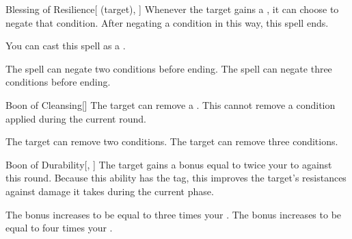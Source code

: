 \lowercase{\hypertarget{spell:Blessing of Resilience}{}}\label{spell:Blessing of Resilience}
\begin{attuneability}[Rank 3]{\hypertarget{spell:Blessing of Resilience}{Blessing of Resilience}}[ (target), ]
Whenever the target gains a , it can choose to negate that condition.
After negating a condition in this way, this spell ends.

You can cast this spell as a .

\rankline
{} The spell can negate two conditions before ending.
 The spell can negate three conditions before ending.
\end{attuneability}
\vspace{0.25em}



\lowercase{\hypertarget{spell:Boon of Cleansing}{}}\label{spell:Boon of Cleansing}
\begin{freeability}[Rank 3]{\hypertarget{spell:Boon of Cleansing}{Boon of Cleansing}}[]
The target can remove a .
This cannot remove a condition applied during the current round.

\rankline
{} The target can remove two conditions.
 The target can remove three conditions.
\end{freeability}
\vspace{0.25em}



\lowercase{\hypertarget{spell:Boon of Durability}{}}\label{spell:Boon of Durability}
\begin{freeability}[Rank 3]{\hypertarget{spell:Boon of Durability}{Boon of Durability}}[, ]
The target gains a bonus equal to twice your  to  against  this round.
Because this ability has the  tag, this improves the target's resistances against damage it takes during the current phase.

\rankline
{} The bonus increases to be equal to three times your .
 The bonus increases to be equal to four times your .
\end{freeability}
\vspace{0.25em}



